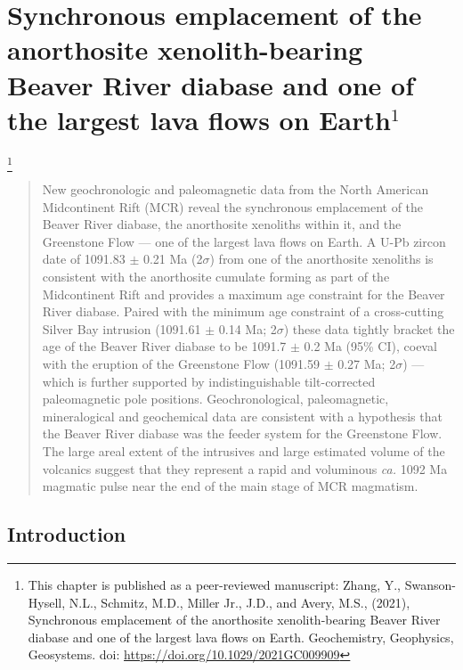 \chapter{Synchronous emplacement of the anorthosite xenolith-bearing Beaver River diabase and one of the largest lava flows on Earth$^{1}$}

\footnote{This chapter is published as a peer-reviewed manuscript: Zhang, Y., Swanson-Hysell, N.L., Schmitz, M.D., Miller Jr., J.D., and Avery, M.S., (2021), Synchronous emplacement of the anorthosite xenolith-bearing Beaver River diabase and one of the largest lava flows on Earth. Geochemistry, Geophysics, Geosystems. doi: \url{https://doi.org/10.1029/2021GC009909}}

\begin{abstract}
New geochronologic and paleomagnetic data from the North American Midcontinent Rift (MCR) reveal the synchronous emplacement of the Beaver River diabase, the anorthosite xenoliths within it, and the Greenstone Flow --- one of the largest lava flows on Earth. A U-Pb zircon date of 1091.83 $\pm$ 0.21 Ma (2$\sigma$) from one of the anorthosite xenoliths is consistent with the anorthosite cumulate forming as part of the Midcontinent Rift and provides a maximum age constraint for the Beaver River diabase. Paired with the minimum age constraint of a cross-cutting Silver Bay intrusion (1091.61 $\pm$ 0.14 Ma; 2$\sigma$) these data tightly bracket the age of the Beaver River diabase to be 1091.7 $\pm$ 0.2 Ma (95\% CI), coeval with the eruption of the Greenstone Flow (1091.59 $\pm$ 0.27 Ma; 2$\sigma$) --- which is further supported by indistinguishable tilt-corrected paleomagnetic pole positions. Geochronological, paleomagnetic, mineralogical and geochemical data are consistent with a hypothesis that the Beaver River diabase was the feeder system for the Greenstone Flow. The large areal extent of the intrusives and large estimated volume of the volcanics suggest that they represent a rapid and voluminous \textit{ca.} 1092 Ma magmatic pulse near the end of the main stage of MCR magmatism.
\end{abstract}
\section{Introduction}

